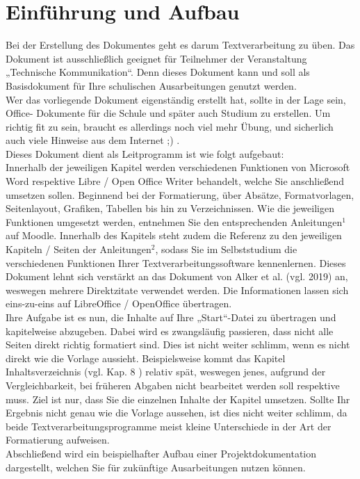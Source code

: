 \documentclass[a4paper, 11pt]{scrartcl}
\begin{document}
	\section{Einführung und Aufbau} %
	\setcounter{page}{1}
	\ifoot{\normalfont\today}
	\begin{justify} \fontsize{11}{5}
		Bei der Erstellung des Dokumentes geht es darum Textverarbeitung zu üben. Das Dokument ist ausschließlich geeignet für Teilnehmer der Veranstaltung „Technische Kommunikation“. Denn dieses Dokument kann und soll als Basisdokument für Ihre schulischen Ausarbeitungen genutzt werden.\vspace{2mm} \\
		Wer das vorliegende Dokument eigenständig erstellt hat, sollte in der Lage sein, Office- Dokumente für die Schule und später auch Studium zu erstellen. Um richtig fit zu sein, braucht es allerdings noch viel mehr Übung, und sicherlich auch viele Hinweise aus dem Internet ;) .\vspace{2mm} \\
		Dieses Dokument dient als Leitprogramm ist wie folgt aufgebaut: \vspace{2mm} \\
		Innerhalb der jeweiligen Kapitel werden verschiedenen Funktionen von Microsoft Word respektive Libre / Open Office Writer behandelt, welche Sie anschließend umsetzen sollen. Beginnend bei der Formatierung, über Absätze, Formatvorlagen, Seitenlayout, Grafiken, Tabellen bis hin zu Verzeichnissen. Wie die jeweiligen Funktionen umgesetzt werden, entnehmen Sie den entsprechenden Anleitungen$^{1}$ auf Moodle. Innerhalb des Kapitels steht zudem die Referenz zu den jeweiligen Kapiteln / Seiten der Anleitungen$^{2}$, sodass Sie im Selbststudium die verschiedenen Funktionen Ihrer Textverarbeitungssoftware kennenlernen. Dieses Dokument lehnt sich verstärkt an das Dokument von Alker et al. (vgl. 2019) an, weswegen mehrere Direktzitate verwendet werden. Die Informationen lassen sich eins-zu-eins auf LibreOffice / OpenOffice übertragen. \vspace{2mm} \\
		Ihre Aufgabe ist es nun, die Inhalte auf Ihre „Start“-Datei zu übertragen und kapitelweise abzugeben. Dabei wird es zwangsläufig passieren, dass nicht alle Seiten direkt richtig formatiert sind. Dies ist nicht weiter schlimm, wenn es nicht direkt wie die Vorlage aussieht. Beispielsweise kommt das Kapitel Inhaltsverzeichnis (vgl. Kap. 8 ) relativ spät, weswegen jenes, aufgrund der Vergleichbarkeit, bei früheren Abgaben nicht bearbeitet werden soll respektive muss. Ziel ist nur, dass Sie die einzelnen Inhalte der Kapitel umsetzen. Sollte Ihr Ergebnis nicht genau wie die Vorlage aussehen, ist dies nicht weiter schlimm, da beide Textverarbeitungsprogramme meist kleine Unterschiede in der Art der Formatierung aufweisen. \vspace{2mm} \\
		Abschließend wird ein beispielhafter Aufbau einer Projektdokumentation dargestellt, welchen Sie für zukünftige Ausarbeitungen nutzen können. \vspace{2mm} 		
	\end{justify}
\end{document}
